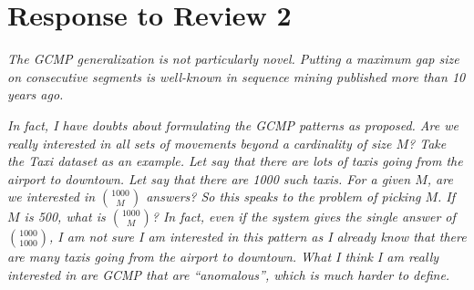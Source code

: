 \section{Response to Review 2}

\emph{The GCMP generalization is not particularly novel. Putting a maximum gap size
on consecutive segments is well-known
in sequence mining published more than
10 years ago.}


\emph{In fact, I have doubts about formulating the GCMP patterns as proposed. Are
we really interested in all sets of movements beyond a cardinality of size $M$? 
Take the Taxi dataset as an example. Let say that there are lots of taxis going
from the airport to downtown. Let say that there are 1000 such taxis. For a
given $M$, are we interested in ${1000 \choose M}$ answers? 
So this speaks to the problem of picking $M$. If $M$ is 500, what is ${1000 \choose M}$? In fact, even if the
system gives the single answer of ${1000\choose 1000}$,
I am not sure I am
interested in this pattern as I already know that there are many taxis going from
the airport to downtown. What I think I am really interested in are GCMP that
are ``anomalous'', which is much harder to define.}

